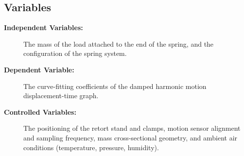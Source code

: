 \subsection{Variables}
\begin{description}
    \item[{\small\bfseries Independent Variables:}] The mass of the load attached to the end of the spring, and the configuration of the spring system.
    \item[{\small\bfseries Dependent Variable:}] The curve-fitting coefficients of the damped harmonic motion displacement-time graph.
    \item[{\small\bfseries Controlled Variables:}] The positioning of the retort stand and clamps, motion sensor alignment and sampling frequency, mass cross-sectional geometry, and ambient air conditions (temperature, pressure, humidity).
\end{description}